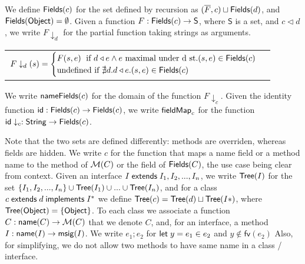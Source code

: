 \documentclass[a4paper, 11pt, english]{article}
\newcommand{\inherits}{\triangleleft}
\begin{document}
We define $\mathsf{Fields}(c)$ for the set defined by recursion as $(\overline{F}, c) \sqcup \mathsf{Fields}(d)$, and $\mathsf{Fields}(\mathsf{Object}) = \emptyset$. Given a function $F : \mathsf{Fields}(c) \rightarrow \mathsf{S}$, where $\mathsf{S}$ is a set, and $c \inherits d$, we write $F \downarrow_d$ for the partial function taking strings as arguments.

\begin{tabular}{l}
$F \downarrow_d (s) = \begin{cases}
F(s, e) \; \text{ if } d \inherits e \wedge e \text{ maximal under d st.} (s, e) \in \Fields(c)\\
\text{undefined if } \nexists d. d \inherits e . (s, e) \in \Fields(c)  \end{cases}$ 

\end{tabular}

We write $\mathsf{nameFields}(c)$ for the domain of the function $F \downarrow_c$. Given the identity function $\mathsf{id} : \mathsf{Fields}(c) \rightarrow \mathsf{Fields}(c)$, we write $\mathsf{fieldMap}_c$ for the function $\mathsf{id} \downarrow_c : \mathsf{String} \rightarrow \mathsf{Fields}(c)$.

Note that the two sets are defined differently: methods are overriden, whereas fields are hidden. We write $c$ for the function that maps a name field or a method name to the method of $\mathcal{M}(C)$ or the field of $\mathsf{Fields}(C)$, the use case being clear from context.
Given an interface $I \; \mathsf{extends} \; I_1, I_2,..., I_n$, we write $\mathsf{Tree}(I)$ for the set $\{I_1, I_2,..., I_n \} \cup \mathsf{Tree}(I_1) \cup ... \cup \mathsf{Tree}(I_n)$, and for a class $ c \; \mathsf{extends} \; d \; \mathsf{implements} \; I^*$ we define $\mathsf{Tree}(c) = \mathsf{Tree}(d) \sqcup \mathsf{Tree}(I*)$, where $\mathsf{Tree}(\mathsf{Object})= \{\mathsf{Object}\}$.
To each class we associate a function $C : \mathsf{name}(C) \rightarrow \mathcal{M}(C)$ that we denote $C$, and, for an interface, a method $I : \mathsf{name}(I) \rightarrow \mathsf{msig}(I)$.
\newcommand{\freeVariable}{\mathsf{fv}}
We write $e_1 ; e_2$ for $\mathsf{let} \; y = e_1 \in e_2$ and $y \notin \freeVariable(e_2)$
Also, for simplifying, we do not allow two methods to have same name in a class / interface.
\end{document}
